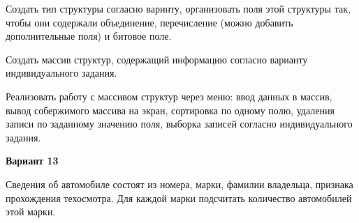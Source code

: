 Создать тип структуры согласно варинту, организовать поля этой структуры так, чтобы они содержали объединение, перечисление (можно добавить дополнительные поля) и битовое поле.

Создать массив структур, содержащий информацию согласно варианту индивидуального задания.

Реализовать работу с массивом структур через меню: ввод данных в массив, вывод собержимого массива на экран, сортировка по одному полю, удаления записи по заданному значению поля, выборка записей согласно индивидуального задания.

\begin{center}
    \textbf{Вариант 13}
\end{center}

Сведения об автомобиле состоят из номера, марки, фамилии владельца, признака прохождения техосмотра. Для каждой марки подсчитать количество автомобилей этой марки.
